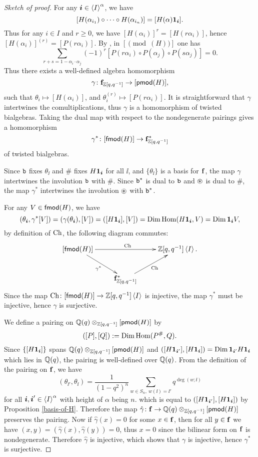 \begin{proof}[Sketch of proof]
    For any $\boldsymbol{i}\in\left<I\right>^\alpha$, we have 
    \[
        [H(\alpha_{i_1})\circ\cdots\circ
        H(\alpha_{i_n})] = [H(\alpha)\mathbf{1}_{\boldsymbol{i}}].
    \] 
    Thus for any $i\in I$ and $r\ge 0$,
    we have $[H(\alpha_i)]^r = [H(r\alpha_i)]$, hence $[H(\alpha_i)]^{(r)} = [P(r\alpha_i)]$.
    By \cite[Lemma 3.10]{Br}, in $[\pmod(H)]$ one has $$\sum_{r+s = 1-\alpha_i
    \cdot\alpha_j}(-1)^r[P(r\alpha_i)\circ P(\alpha_j)\circ P(s\alpha_j)] = 0.$$
    Thus there exists a well-defined algebra homomorphism 
    \[
        \gamma\colon\mathbf{f}_{\mathbb{Z}[q,q^{-1}]}\to[\mathsf{pmod}(H)],
    \]    
    such that 
    $\theta_i\mapsto[H(\alpha_i)]$, and $\theta_i^{(r)}\mapsto[P(r\alpha_i)]$.
    It is straightforward that $\gamma$ intertwines the comultiplications,
    thus $\gamma$ is a homomorphism of twisted bialgebras. Taking the dual map
    with respect to the nondegenerate pairings gives a homomorphism 
    \[
        \gamma^*\colon[\mathsf{fmod}(H)]\to\mathbf{f}_{\mathbb{Z}[q,q^{-1}]}^*
    \] 
    of twisted bialgebras.

    Since $\mathtt{b}$ fixes $\theta_{\ii}$ and $\#$ fixes $H\mathbf{1}_{\boldsymbol{i}}$ for all $\ii$,
    and $\{\theta_{\ii}\}$ is a basis for $\mathbf{f}$, the map $\gamma$ intertwines 
    the involution $\mathtt{b}$ with $\#$. Since $\mathtt{b}^*$ is dual to $\mathtt{b}$ and
    $\circledast$ is dual to $\#$, the map $\gamma^*$ intertwines the involution $\circledast$ with $\mathtt{b}^*$.

    For any $V\in\mathsf{fmod}(H)$, we have 
    \[
        (\theta_{\boldsymbol{i}},\gamma^*[V])
         = (\gamma(\theta_{\boldsymbol{i}}),[V]) = ([H\mathbf{1}_{\boldsymbol{i}}],[V]) = \operatorname{Dim}\operatorname{Hom}(H\mathbf{1}_{\boldsymbol{i}},V)
         = \operatorname{Dim}\mathbf{1}_{\boldsymbol{i}}V,
    \] 
    by definition of $\operatorname{Ch}$, the following diagram commutes:
    \[
    \xymatrix{
        [\fmod(H)]\ar[rr]^{\Ch}\ar[rd]_{\gamma^*}&&\Z[q,q^{-1}]\<I\>.\\
        &\f_{\Z[q,q^{-1}]}^*\ar[ru]_{\Ch}
    }
    \]
    Since the map $\operatorname{Ch}\colon[\mathsf{fmod}(H)]\to\mathbb{Z}[q,q^{-1}]\left<I\right>$ is injective,
    the map $\gamma^*$ must be injective, hence $\gamma$ is surjective.

    We define a pairing on $\mathbb{Q}(q)\otimes_{\mathbb{Z}[q,q^{-1}]}[\mathsf{pmod}(H)]$ by 
    \[
        ([P],[Q]) := \operatorname{Dim}\operatorname{Hom}(P^\#,Q).
    \] 
    Since $\{[H\mathbf{1}_{\boldsymbol{i}}]\}$ spans 
    $\mathbb{Q}(q)\otimes_{\mathbb{Z}[q,q^{-1}]}[\mathsf{pmod}(H)]$ and 
    $([H\mathbf{1}_{\boldsymbol{i}'}],[H\mathbf{1}_{\boldsymbol{i}}]) = \operatorname{Dim} \mathbf{1}_{\boldsymbol{i}'}H\mathbf{1}_{\boldsymbol{i}}$ which lies in $\mathbb{Q}(q)$, the pairing
    is well-defined over $\mathbb{Q}(q)$. From the definition of the pairing on $\mathbf{f}$,
    we have 
    \[
        (\theta_{\ii'},\theta_{\ii}) = \dfrac{1}{(1-q^2)^n}
        \sum_{w\in S_n,\ w(\ii) = \ii'}q^{\deg(w;\ii)}
    \] 
    for all $\boldsymbol{i},\boldsymbol{i}'\in\left<I\right>^\alpha$
    with height of $\alpha$ being $n$. which is equal to
    $([H\mathbf{1}_{\boldsymbol{i}'}],[H\mathbf{1}_{\boldsymbol{i}}])$ by Proposition \ref{basis-of-H}.
    Therefore the map $\hat\gamma\colon\mathbf{f}\to\mathbb{Q}(q)\otimes_{\mathbb{Z}[q,q^{-1}]}[\mathsf{pmod}(H)]$
    preserves the pairing. Now if $\hat\gamma(x) = 0$ for some $x\in\mathbf{f}$, then
    for all $y\in\mathbf{f}$ we have $(x,y) = (\hat\gamma(x),\hat\gamma(y)) = 0$,
    thus $x = 0$ since the bilinear form on $\mathbf{f}$ is nondegenerate.
    Therefore $\hat\gamma$ is injective, which shows that
    $\gamma$ is injective, hence $\gamma^*$ is surjective.
\end{proof}

